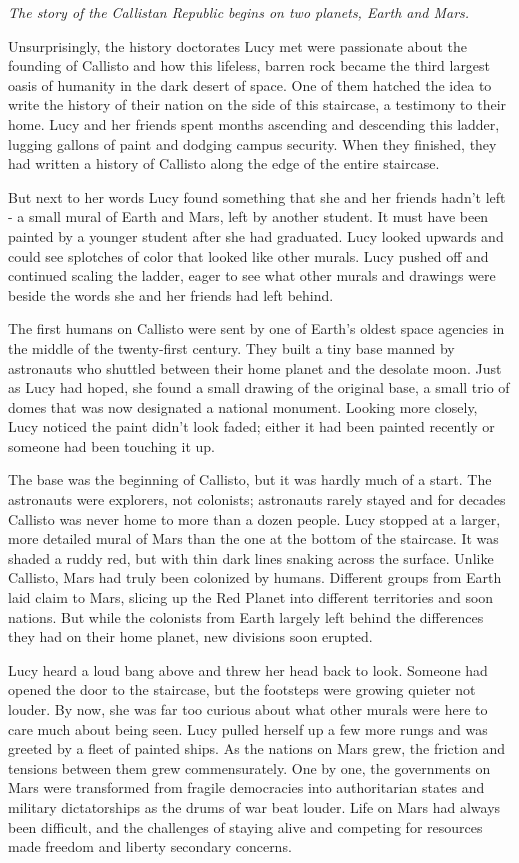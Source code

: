 \documentclass[openany, 12pt]{book} %
\begin{document}
\textit{The story of the Callistan Republic begins on two planets, Earth and Mars.}

Unsurprisingly, the history doctorates Lucy met were passionate about the founding of Callisto and how this lifeless, barren rock became the third largest oasis of humanity in the dark desert of space. One of them hatched the idea to write the history of their nation on the side of this staircase, a testimony to their home. Lucy and her friends spent months ascending and descending this ladder, lugging gallons of paint and dodging campus security. When they finished, they had written a history of Callisto along the edge of the entire staircase.

But next to her words Lucy found something that she and her friends hadn't left - a small mural of Earth and Mars, left by another student. It must have been painted by a younger student after she had graduated. Lucy looked upwards and could see splotches of color that looked like other murals. Lucy pushed off and continued scaling the ladder, eager to see what other murals and drawings were beside the words she and her friends had left behind.

The first humans on Callisto were sent by one of Earth's oldest space agencies in the middle of the twenty-first century. They built a tiny base manned by astronauts who shuttled between their home planet and the desolate moon. Just as Lucy had hoped, she found a small drawing of the original base, a small trio of domes that was now designated a national monument. Looking more closely, Lucy noticed the paint didn't look faded; either it had been painted recently or someone had been touching it up. 

The base was the beginning of Callisto, but it was hardly much of a start. The astronauts were explorers, not colonists; astronauts rarely stayed and for decades Callisto was never home to more than a dozen people. Lucy stopped at a larger, more detailed mural of Mars than the one at the bottom of the staircase. It was shaded a ruddy red, but with thin dark lines snaking across the surface. Unlike Callisto, Mars had truly been colonized by humans. Different groups from Earth laid claim to Mars, slicing up the Red Planet into different territories and soon nations. But while the colonists from Earth largely left behind the differences they had on their home planet, new divisions soon erupted.

Lucy heard a loud bang above and threw her head back to look. Someone had opened the door to the staircase, but the footsteps were growing quieter not louder. By now, she was far too curious about what other murals were here to care much about being seen. Lucy pulled herself up a few more rungs and was greeted by a fleet of painted ships. As the nations on Mars grew, the friction and tensions between them grew commensurately. One by one, the governments on Mars were transformed from fragile democracies into authoritarian states and military dictatorships as the drums of war beat louder. Life on Mars had always been difficult, and the challenges of staying alive and competing for resources made freedom and liberty secondary concerns.
\end{document}
